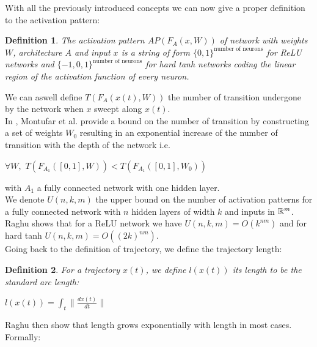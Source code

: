 \documentclass[12pt, a4paper]{article}
\newtheorem{definition}{Definition}
\begin{document}
With all the previously introduced concepts we can now give a proper definition to the activation pattern:

\begin{definition}
  The activation pattern $AP(F_A(x,W))$ of network with weights $W$, architecture $A$ and input $x$ is a string of form $\{0,1\}^{\text{number of neurons}}$ for ReLU networks and $\{-1,0,1\}^{\text{number of neurons}}$ for hard tanh networks coding the linear region of the activation function of every neuron.
\end{definition}

We can aswell define $T(F_A(x(t),W))$ the number of transition undergone by the network when $x$ sweept along $x(t)$.\\

In \cite{pascanu_number_2014}, Montufar et al. provide a bound on the number of transition by constructing a set of weights $W_0$ resulting in an exponential increase of the number of transition with the depth of the network i.e.\\

\begin{center}
  $\forall W,$ $T(F_{A_1}([0,1],W)) < T(F_{A_1}([0,1],W_0))$  
\end{center}

with $A_1$ a fully connected network with one hidden layer.\\

We denote $U(n,k,m)$ the upper bound on the number of activation patterns for a fully connected network with $n$ hidden layers of width $k$ and inputs in $\mathbb{R}^m$. Raghu shows that for a ReLU network we have $U(n,k,m) = O(k^{nm})$ and for hard tanh $U(n,k,m) = O((2k)^{nm})$.\\

Going back to the definition of trajectory, we define the trajectory length:

\begin{definition}
  For a trajectory $x(t)$, we define $l(x(t))$ its length to be the standard arc length:
  \begin{center}
    $l(x(t)) = \int_t \lVert \frac{dx(t)}{dt} \rVert$
  \end{center}
 
\end{definition}

Raghu then show that length grows exponentially with length in most cases. Formally:\\
\end{document}
